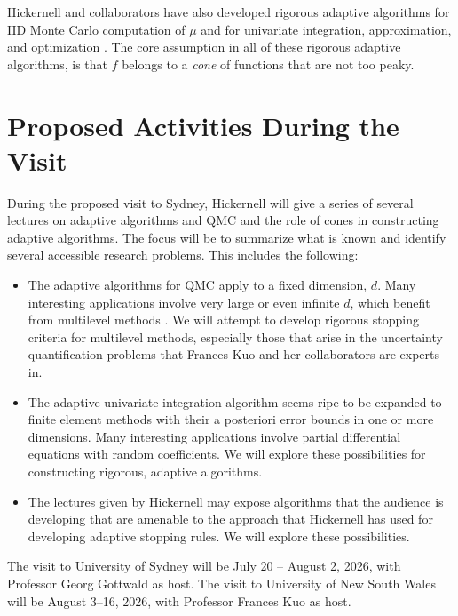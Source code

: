 \documentclass{amsart}
\begin{document}
Hickernell and collaborators have also developed rigorous adaptive algorithms for IID Monte Carlo computation of $\mu$ \cite{HicEtal14a} and for univariate integration, approximation, and optimization \cite{ChoEtal17a,HicETal14b}.
The core assumption in all of these rigorous adaptive algorithms, is that $f$ belongs to a \emph{cone} of functions that are not too peaky.

\section{Proposed Activities During the Visit}

During the proposed visit to Sydney, Hickernell will give a series of several lectures on adaptive algorithms and QMC and the role of cones in constructing adaptive algorithms.  The focus will be to summarize what is known and identify several accessible research problems.  This includes the following:
\begin{itemize}
    \item The adaptive algorithms for QMC apply to a fixed dimension, $d$. Many interesting applications involve very large or even infinite $d$, which benefit from multilevel methods \cite{Gil14a}.  We will attempt to develop rigorous stopping criteria for multilevel methods, especially those that arise in the uncertainty quantification problems that Frances Kuo and her collaborators are experts in.

    \item The adaptive univariate integration algorithm seems ripe to be expanded to finite element methods with their a posteriori error bounds in one or more dimensions.  Many interesting applications involve partial differential equations with random coefficients.  We will explore these possibilities for constructing rigorous, adaptive algorithms.

    \item The lectures given by Hickernell may expose algorithms that the audience is developing that are amenable to the approach that Hickernell has used for developing adaptive stopping rules.  We will explore these possibilities.
\end{itemize}
The visit to University of Sydney will be July 20 -- August 2, 2026, with Professor Georg Gottwald as host.  The visit to University of New South Wales will be August 3--16, 2026, with Professor Frances Kuo as host.  %



\end{document}
